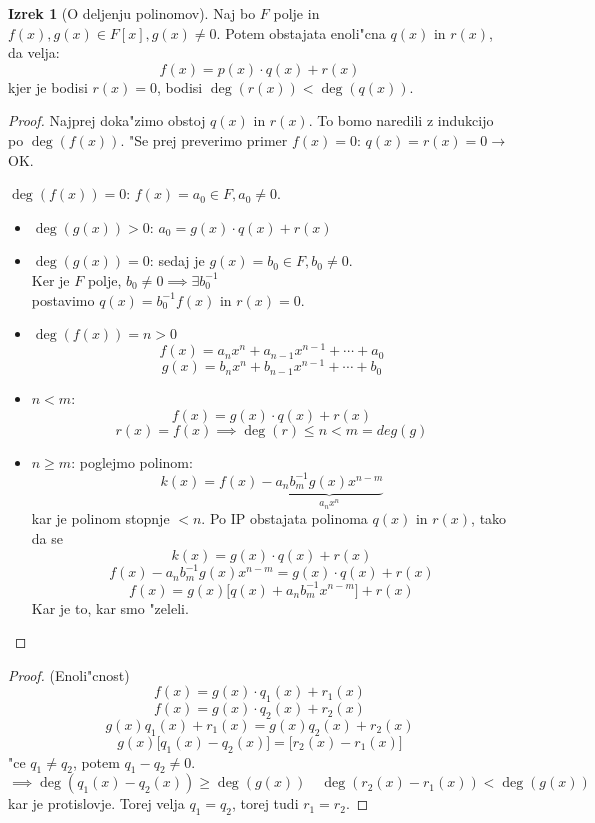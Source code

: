\documentclass[11pt, a4paper]{article}
\theoremstyle{definition}
\newtheorem{theorem}[counter]{Izrek}
\theoremstyle{remark}
\begin{document}
	\begin{theorem}[O deljenju polinomov]
		Naj bo $F$ polje in $f(x), g(x) \in F[x], g(x) \neq 0$. Potem obstajata enoli"cna $q(x)$ in $r(x)$, da velja:
		\[ f(x) = p(x) \cdot q(x) + r(x) \]
		kjer je bodisi $r(x) = 0$, bodisi $\deg(r(x)) < \deg(q(x))$.
	\end{theorem}
	\begin{proof}
		Najprej doka"zimo obstoj $q(x)$ in $r(x)$. To bomo naredili z indukcijo po $\deg(f(x))$.
		"Se prej preverimo primer $f(x) = 0$: $q(x) = r(x) = 0 \rightarrow$ OK.
		
		$\deg(f(x)) = 0$: $f(x) = a_0 \in F, a_0 \neq 0$.
		\begin{itemize}
			\item $\deg(g(x)) > 0$: $a_0 = g(x) \cdot q(x) + r(x) $
			\item $\deg(g(x)) = 0$: sedaj je $g(x) = b_0 \in F, b_0 \neq 0$.\\
			Ker je $F$ polje, $b_0 \neq 0 \implies \exists b_0^{-1}$\\
			postavimo $q(x) = b_0^{-1}f(x)$ in $r(x) = 0$.
			\item $\deg(f(x)) = n > 0$
			\[ f(x) = a_nx^n + a_{n-1}x^{n-1}+ \cdots + a_0 \]
			\[ g(x) = b_nx^n + b_{n-1}x^{n-1}+ \cdots + b_0 \]
			\item $n < m$:
			\[ f(x) = g(x) \cdot q(x) + r(x) \]
			\[ r(x) = f(x) \implies \deg(r) \leq n < m = deg(g) \]
			\item $n \geq m$: poglejmo polinom:
			\[ k(x) = f(x) - \underbrace{a_nb_m^{-1}g(x)x^{n-m}}_{a_nx^n} \]
			kar je polinom stopnje $< n$.
			Po IP obstajata polinoma $q(x)$ in $r(x)$, tako da se
			\[ k(x) = g(x) \cdot q(x) + r(x) \]
			\[ f(x) - a_nb_m^{-1}g(x)x^{n-m} = g(x) \cdot q(x) + r(x) \]
			\[ f(x) = g(x)\Big[q(x) + a_nb_m^{-1}x^{n-m} \Big] + r(x) \]
			Kar je to, kar smo "zeleli.
		\end{itemize}
	\end{proof}
	\begin{proof}(Enoli"cnost)\\
		\[ f(x) = g(x) \cdot q_1(x) + r_1(x) \]
		\[ f(x) = g(x) \cdot q_2(x) + r_2(x) \]
		\[ g(x)q_1(x)+r_1(x) = g(x)q_2(x)+r_2(x) \]
		\[ g(x)\Big[ q_1(x)-q_2(x) \Big] = \Big[ r_2(x) - r_1(x) \Big] \]
		"ce $q_1 \neq q_2$, potem $q_1 - q_2 \neq 0$.
		\[ \implies \deg(q_1(x)-q_2(x)) \geq \deg(g(x)) \quad \deg(r_2(x) - r_1(x)) < \deg(g(x)) \]
		kar je protislovje.
		Torej velja $q_1 = q_2$, torej tudi $r_1 = r_2$.
	\end{proof}
\end{document}
